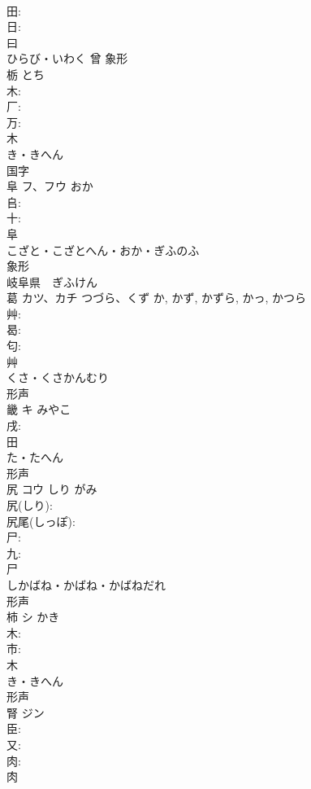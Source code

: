 \documentclass[8pt]{extreport}
\begin{document}
\begin{CJK}{UTF8}{min}
\\	田: 
\\	日: 
\\	曰	
\\	ひらび・いわく	曾	象形 
\\	栃		とち		
\\	木: 
\\	厂: 
\\	万: 
\\	木	
\\	き・きへん	
\\	国字 
\\	阜	フ、フウ		おか	
\\	𠂤: 
\\	十: 
\\	阜	
\\	こざと・こざとへん・おか・ぎふのふ	
\\	象形 
\\	岐阜県　ぎふけん 
\\	葛	カツ、カチ	つづら、くず	か, かず, かずら, かっ, かつら	
\\	艸: 
\\	曷: 
\\	匂: 
\\	艸	
\\	くさ・くさかんむり	
\\	形声 
\\	畿	キ	みやこ		
\\	戌: 
\\	田	
\\	た・たへん	
\\	形声 
\\	尻	コウ	しり	がみ	
\\	尻(しり): 
\\	尻尾(しっぽ): 
\\	尸: 
\\	九: 
\\	尸	
\\	しかばね・かばね・かばねだれ	
\\	形声 
\\	柿	シ	かき		
\\	木: 
\\	市: 
\\	木	
\\	き・きへん	
\\	形声 
\\	腎	ジン			
\\	臣: 
\\	又: 
\\	肉: 
\\	肉	

\end{CJK}
\end{document}
